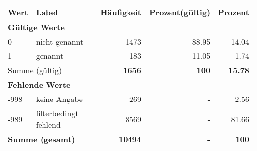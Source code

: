      \begin{longtable}{lXrrr}
     \toprule
     \textbf{Wert} & \textbf{Label} & \textbf{Häufigkeit} & \textbf{Prozent(gültig)} & \textbf{Prozent} \\
     \endhead
     \midrule
     \multicolumn{5}{l}{\textbf{Gültige Werte}}\\

     0 &
     \multicolumn{1}{X}{ nicht genannt   } &


       \num{1473} &
       \num[round-mode=places,round-precision=2]{88.95} &
         \num[round-mode=places,round-precision=2]{14.04} \\

     1 &
     \multicolumn{1}{X}{ genannt   } &


       \num{183} &
       \num[round-mode=places,round-precision=2]{11.05} &
         \num[round-mode=places,round-precision=2]{1.74} \\
     \midrule
     \multicolumn{2}{l}{Summe (gültig)} &
       \textbf{\num{1656}} &
     \textbf{\num{100}} &
       \textbf{\num[round-mode=places,round-precision=2]{15.78}} \\
     \multicolumn{5}{l}{\textbf{Fehlende Werte}}\\
       -998 &
       keine Angabe &
         \num{269} &
        - &
         \num[round-mode=places,round-precision=2]{2.56} \\
       -989 &
       filterbedingt fehlend &
         \num{8569} &
        - &
         \num[round-mode=places,round-precision=2]{81.66} \\
     \midrule
     \multicolumn{2}{l}{\textbf{Summe (gesamt)}} &
          \textbf{\num{10494}} &
        \textbf{-} &
        \textbf{\num{100}} \\
     \bottomrule
     \end{longtable}
     
